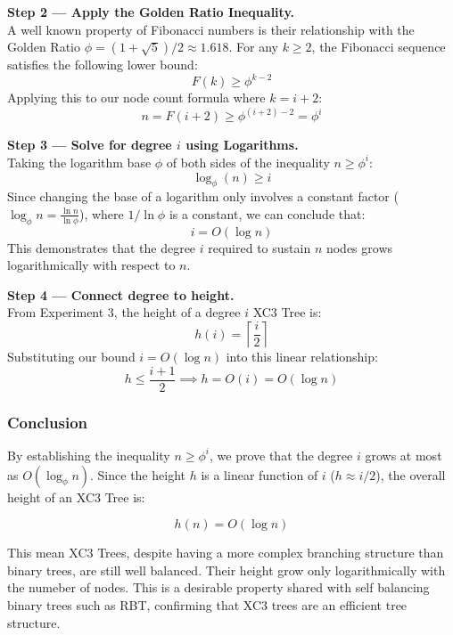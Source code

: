 \documentclass[letterpaper]{article}
\theoremstyle{plain}
\theoremstyle{definition}
\theoremstyle{remark}
\begin{document}
\textbf{Step 2 — Apply the Golden Ratio Inequality.} \\
A well known property of Fibonacci numbers is their relationship with the
Golden Ratio $\phi = (1 + \sqrt{5})/2 \approx 1.618$. For any
$k \ge 2$, the Fibonacci sequence satisfies the following lower bound:
$$F(k) \ge \phi^{k-2}$$
Applying this to our node count formula where $k = i+2$:
$$n = F(i+2) \ge \phi^{(i+2)-2} = \phi^i$$

\textbf{Step 3 — Solve for degree $i$ using Logarithms.} \\
Taking the logarithm base $\phi$ of both sides of the inequality $n \ge \phi^i$:
$$\log_\phi(n) \ge i$$
Since changing the base of a logarithm only involves a constant factor
($\log_\phi n = \frac{\ln n}{\ln \phi}$), where $1/\ln \phi$ is a constant,
we can conclude that:
$$i = O(\log n)$$
This demonstrates that the degree $i$ required to sustain $n$ nodes grows
logarithmically with respect to $n$.

\textbf{Step 4 — Connect degree to height.} \\
From Experiment 3, the height of a degree $i$ XC3 Tree is:
$$h(i) = \left\lceil \frac{i}{2} \right\rceil$$
Substituting our bound $i = O(\log n)$ into this linear relationship:
$$h \le \frac{i + 1}{2} \implies h = O(i) = O(\log n)$$

\subsubsection*{Conclusion}
By establishing the inequality $n \ge \phi^i$, we prove that the degree $i$  grows at most as $O(\log_\phi n)$. Since the height $h$ is a linear function 
of $i$ ($h \approx i/2$), the overall height of an XC3 Tree is:

$$ h(n) = O(\log n)$$

This mean XC3 Trees, despite having a more complex branching structure than binary trees, are still well balanced. Their height grow only logarithmically
with the numeber of nodes. This is a desirable property shared with self balancing binary trees such as RBT, confirming that XC3 trees are
an efficient tree structure.

\end{document}
